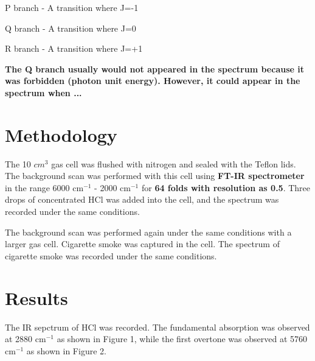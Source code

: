\documentclass[twocolumn]{article} %
\let\tempthree\enumerate
\let\tempfour\endenumerate
\renewenvironment{enumerate}{\tempthree\setlength{\itemsep}{0pt}}{\tempfour}
\begin{document}
\begin{enumerate}
    \item P branch - A transition where J=-1
    \item Q branch - A transition where J=0
    \item R branch - A transition where J=+1
\end{enumerate}

\textbf{The Q branch usually would not appeared in the spectrum because it was forbidden (photon unit energy). 
However, it could appear in the spectrum when ...}




\section{Methodology}

The 10 $cm^3$ gas cell was flushed with nitrogen and sealed with the Teflon lids. The background scan was performed with this cell using \textbf{FT-IR spectrometer} in the range 6000 cm$^{-1}$ - 2000 cm$^{-1}$ for \textbf{64 folds with resolution as 0.5}. Three drops of concentrated HCl was added into the cell, and the spectrum was recorded under the same conditions. 

The background scan was performed again under the same conditions with a larger gas cell. Cigarette smoke was captured in the cell. The spectrum of cigarette smoke was recorded under the same conditions. 



\section{Results}  

The IR sepctrum of HCl was recorded. The fundamental absorption was observed at 2880 cm$^{-1}$ as shown in Figure 1, while the first overtone was observed at 5760 cm$^{-1}$ as shown in Figure 2. 
\end{document}
